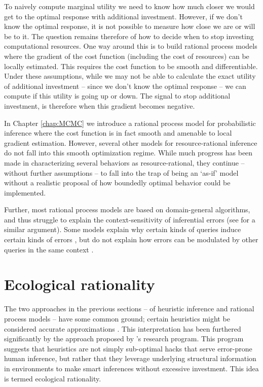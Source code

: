 To naively compute marginal utility we need to know how much closer we would get to the optimal response with additional investment. However, if we don't know the optimal response, it is not possible to measure how close we are or will be to it. The question remains therefore of how to decide when to stop investing computational resources. One way around this is to build rational process models where the gradient of the cost function (including the cost of resources) can be locally estimated. This requires the cost function to be smooth and differentiable. Under these assumptions, while we may not be able to calculate the exact utility of additional investment -- since we don't know the optimal response -- we can compute if this utility is going up or down. The signal to stop additional investment, is therefore when this gradient becomes negative.

In Chapter \ref{chap:MCMC} we introduce a rational process model for probabilistic inference where the cost function is in fact smooth and amenable to local gradient estimation. However, several other models for resource-rational inference do not fall into this smooth optimization regime. While much progress has been made in characterizing several behaviors as resource-rational, they continue -- without further assumptions -- to fall into the trap of being an `as-if' model without a realistic proposal of how boundedly optimal behavior could be implemented. 

Further, most rational process models are based on domain-general algorithms, and thus struggle to explain the context-sensitivity of inferential errors (see \citet{mercier2017enigma} for a similar argument). Some models explain why certain kinds of queries induce certain kinds of errors \citep{dasgupta2017hypotheses}, but do not explain how errors can be modulated by other queries in the same context \citep{gershman2014amortized,dasgupta2018remembrance}. 


\section{Ecological rationality}

The two approaches in the previous sections -- of heuristic inference and rational process models -- have some common ground; certain heuristics might be considered accurate approximations \citep{gigerenzer2009homo, parpart2018heuristics, belousov2016catching}. This interpretation has been furthered significantly by the approach proposed by \citet{gigerenzer2011heuristic}'s research program. This program suggests that heuristics are not simply sub-optimal hacks that serve error-prone human inference, but rather that they leverage underlying structural information in environments to make smart inferences without excessive investment. This idea is termed ecological rationality.


